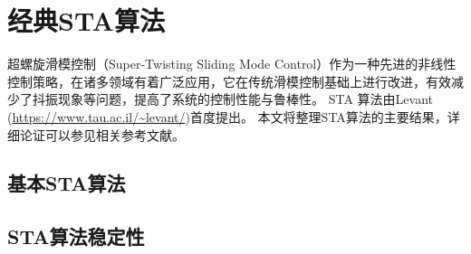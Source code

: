 \chapter{经典STA算法}

超螺旋滑模控制（Super-Twisting Sliding Mode Control）作为一种先进的非线性控制策略，在诸多领域有着广泛应用，它在传统滑模控制基础上进行改进，有效减少了抖振现象等问题，提高了系统的控制性能与鲁棒性。
STA 算法由Levant (\url{https://www.tau.ac.il/~levant/})首度提出。
本文将整理STA算法的主要结果，详细论证可以参见相关参考文献。

\section{基本STA算法}

\section{STA算法稳定性}
